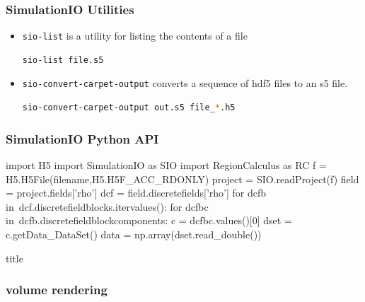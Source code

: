 \documentclass[]{beamer}
\newcommand{\transitionslide}[1]{
  \begin{frame}[plain]
  \vfill
  \centering
  \begin{beamercolorbox}[sep=8pt,center,shadow=true,rounded=true]{title}
    \usebeamerfont{title}{#1}
  \end{beamercolorbox}
  \vfill
\end{frame}
}
\begin{document}
\begin{frame}[fragile]
  \frametitle{SimulationIO Utilities}
  \begin{itemize}
  \item {\color{blue}\lstinline$sio-list$} is a utility for listing the contents of
    a file
\begin{lstlisting}[language=bash]
  sio-list file.s5
\end{lstlisting}
  \item {\color{blue}\lstinline$sio-convert-carpet-output$} converts a
    sequence of hdf5 files to an s5 file.
\begin{lstlisting}[language=bash]
  sio-convert-carpet-output out.s5 file_*.h5
\end{lstlisting}
  \end{itemize}
\end{frame}

\begin{frame}[fragile]
  \frametitle{SimulationIO Python API}
  \begin{python}
    import H5
    import SimulationIO as SIO
    import RegionCalculus as RC
    f = H5.H5File(filename,H5.H5F_ACC_RDONLY)
    project = SIO.readProject(f)
    field = project.fields['rho']
    dcf = field.discretefields['rho']
    for dcfb in\
    dcf.discretefieldblocks.itervalues():
        for dcfbc in\
        dcfb.discretefieldblockcomponents:
            c = dcfbc.values()[0]
            dset = c.getData_DataSet()
            data = np.array(dset.read_double())
  \end{python}
\end{frame}

\transitionslide{\Huge yt}

\begin{frame}
  \frametitle{volume rendering}
  \begin{center}
  \end{center}
\end{frame}
\end{document}

